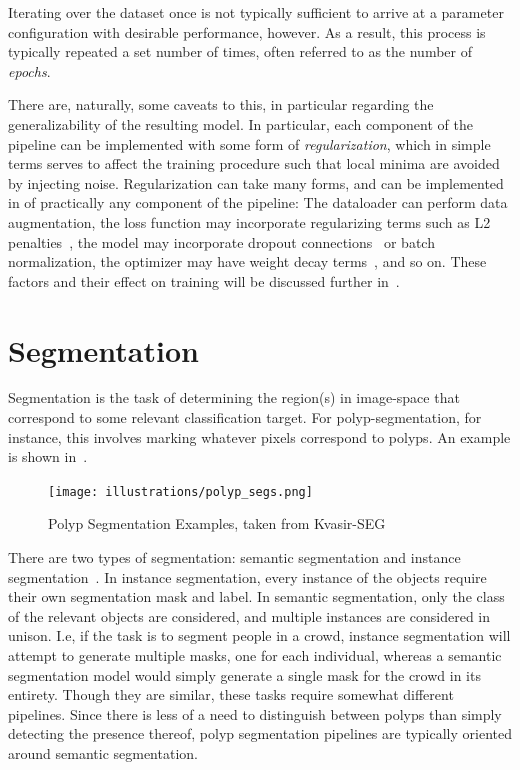         Iterating over the dataset once is not typically sufficient to arrive at a parameter configuration with desirable performance, however. As a result, this process is typically repeated a set number of times, often referred to as the number of \textit{epochs}. 
        
        There are, naturally, some caveats to this, in particular regarding the generalizability of the resulting model. In particular, each component of the pipeline can be implemented with some form of \textit{regularization}, which in simple terms serves to affect the training procedure such that local minima are avoided by injecting noise. Regularization can take many forms, and can be implemented in of practically any component of the pipeline: The dataloader can perform data augmentation, the loss function may incorporate regularizing terms such as L2 penalties~\cite{l2_reg}, the model may incorporate dropout connections~\cite{dropout} or batch normalization\cite{batchnorm}, the optimizer may have weight decay terms~\cite{weight_decay}, and so on. These factors and their effect on training will be discussed further in~. 

\section{Segmentation}
    Segmentation is the task of determining the region(s) in image-space that correspond to some relevant classification target. For polyp-segmentation, for instance, this involves marking whatever pixels correspond to polyps. An example is shown in~. 
    \begin{figure}[htb]
        \centering
        \texttt{[image: illustrations/polyp\_segs.png]}
        \caption{Polyp Segmentation Examples, taken from Kvasir-SEG\cite{kvasir}}
        \label{fig:segmentation}
    \end{figure}
    
    There are two types of segmentation: semantic segmentation and instance segmentation~\cite{segmentation_survey}. In instance segmentation, every instance of the objects require their own segmentation mask and label. In semantic segmentation, only the class of the relevant objects are considered, and multiple instances are considered in unison. I.e, if the task is to segment people in a crowd, instance segmentation will attempt to generate multiple masks, one for each individual, whereas a semantic segmentation model would simply generate a single mask for the crowd in its entirety. Though they are similar, these tasks require somewhat different pipelines. Since there is less of a need to distinguish between polyps than simply detecting the presence thereof, polyp segmentation pipelines are typically oriented around semantic segmentation. 
    
